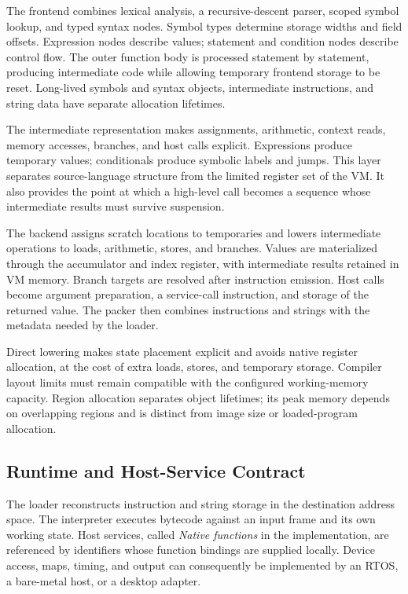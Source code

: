 \documentclass[conference,letterpaper]{IEEEtran}
\begin{document}
The frontend combines lexical analysis, a recursive-descent parser, scoped symbol lookup, and typed syntax nodes. Symbol types determine storage widths and field offsets. Expression nodes describe values; statement and condition nodes describe control flow. The outer function body is processed statement by statement, producing intermediate code while allowing temporary frontend storage to be reset. Long-lived symbols and syntax objects, intermediate instructions, and string data have separate allocation lifetimes.

The intermediate representation makes assignments, arithmetic, context reads, memory accesses, branches, and host calls explicit. Expressions produce temporary values; conditionals produce symbolic labels and jumps. This layer separates source-language structure from the limited register set of the VM. It also provides the point at which a high-level call becomes a sequence whose intermediate results must survive suspension.

The backend assigns scratch locations to temporaries and lowers intermediate operations to loads, arithmetic, stores, and branches. Values are materialized through the accumulator and index register, with intermediate results retained in VM memory. Branch targets are resolved after instruction emission. Host calls become argument preparation, a service-call instruction, and storage of the returned value. The packer then combines instructions and strings with the metadata needed by the loader.

Direct lowering makes state placement explicit and avoids native register allocation, at the cost of extra loads, stores, and temporary storage. Compiler layout limits must remain compatible with the configured working-memory capacity. Region allocation separates object lifetimes; its peak memory depends on overlapping regions and is distinct from image size or loaded-program allocation.

\subsection{Runtime and Host-Service Contract}
The loader reconstructs instruction and string storage in the destination address space. The interpreter executes bytecode against an input frame and its own working state. Host services, called \emph{Native functions} in the implementation, are referenced by identifiers whose function bindings are supplied locally. Device access, maps, timing, and output can consequently be implemented by an RTOS, a bare-metal host, or a desktop adapter.
\end{document}
